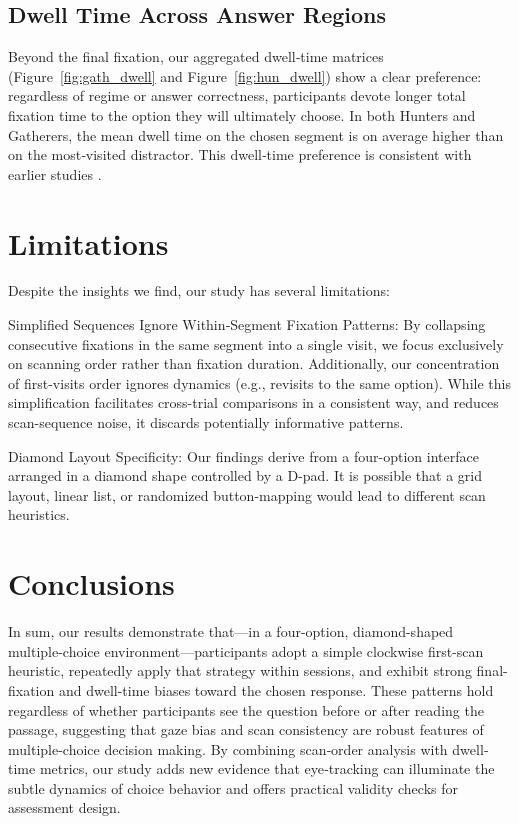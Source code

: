 \documentclass{article}
\begin{document}
\subsection*{Dwell Time Across Answer Regions}
Beyond the final fixation, our aggregated dwell‐time matrices (Figure~\ref{fig:gath_dwell} and Figure~\ref{fig:hun_dwell}) show a clear preference: regardless of regime or answer correctness, participants devote longer total fixation time to the option they will ultimately choose. In both Hunters and Gatherers, the mean dwell time on the chosen segment is on average higher than on the most‐visited distractor. This dwell‐time preference is consistent with earlier studies \parencite{lindner2014tracking} \parencite{tsai2012visual}.


\section{Limitations}
Despite the insights we find, our study has several limitations:

Simplified Sequences Ignore Within‐Segment Fixation Patterns: By collapsing consecutive fixations in the same segment into a single visit, we focus exclusively on scanning order rather than fixation duration. Additionally, our concentration of first-visits order ignores dynamics (e.g., revisits to the same option). While this simplification facilitates cross-trial comparisons in a consistent way, and reduces scan-sequence noise, it discards potentially informative patterns.

Diamond Layout Specificity: Our findings derive from a four-option interface arranged in a diamond shape controlled by a D-pad. It is possible that a grid layout, linear list, or randomized button-mapping would lead to different scan heuristics. 


\section{Conclusions}
In sum, our results demonstrate that—in a four-option, diamond-shaped multiple-choice environment—participants adopt a simple clockwise first-scan heuristic, repeatedly apply that strategy within sessions, and exhibit strong final-fixation and dwell-time biases toward the chosen response. These patterns hold regardless of whether participants see the question before or after reading the passage, suggesting that gaze bias and scan consistency are robust features of multiple-choice decision making. By combining scan‐order analysis with dwell‐time metrics, our study adds new evidence that eye‐tracking can illuminate the subtle dynamics of choice behavior and offers practical validity checks for assessment design.
\end{document}
